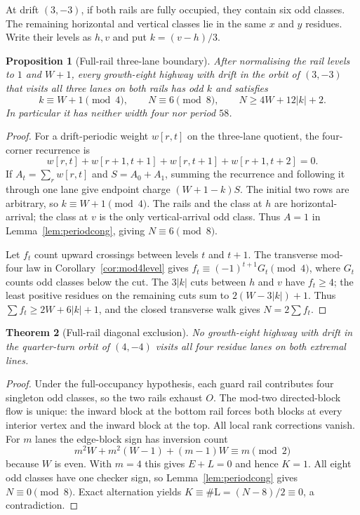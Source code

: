 \documentclass[11pt,letterpaper]{article}
\theoremstyle{plain}
\newtheorem{theorem}{Theorem}[section]
\newtheorem{proposition}[theorem]{Proposition}
\theoremstyle{definition}
\newcommand{\turnL}{\mathrm{L}}
\begin{document}
\begin{NoHyper}
At drift $(3,-3)$, if both rails are fully occupied, they contain six odd classes. The remaining
horizontal and vertical classes lie in the same $x$ and $y$ residues.  Write
their levels as $h,v$ and put $k=(v-h)/3$.

\begin{proposition}[Full-rail three-lane boundary]\label{prop:g8m3}
After normalising the rail levels to $1$ and $W+1$, every growth-eight highway
with drift in the orbit of $(3,-3)$ that visits all three lanes on both rails
has odd $k$ and satisfies
\[
 k\equiv W+1\pmod4,\qquad N\equiv6\pmod8,\qquad
 N\ge4W+12|k|+2.
\]
In particular it has neither width four nor period $58$.
\end{proposition}

\begin{proof}
For a drift-periodic weight $w[r,t]$ on the three-lane quotient, the four-corner
recurrence is
\[
 w[r,t]+w[r+1,t+1]+w[r,t+1]+w[r+1,t+2]=0.
\]
If $A_t=\sum_rw[r,t]$ and $S=A_0+A_1$, summing the recurrence and following it
through one lane give endpoint charge $(W+1-k)S$.  The initial two rows are
arbitrary, so $k\equiv W+1\pmod4$.  The rails and the class at $h$ are
horizontal-arrival; the class at $v$ is the only vertical-arrival odd class.
Thus $A=1$ in Lemma~\ref{lem:periodcong}, giving $N\equiv6\pmod8$.

Let $f_t$ count upward crossings between levels $t$ and $t+1$.  The transverse
mod-four law in Corollary~\ref{cor:mod4level} gives
$f_t\equiv(-1)^{t+1}G_t\pmod4$, where $G_t$ counts odd classes below the cut.
The $3|k|$ cuts between $h$ and $v$ have $f_t\ge4$; the least positive residues
on the remaining cuts sum to $2(W-3|k|)+1$.  Thus
$\sum f_t\ge2W+6|k|+1$, and the closed transverse walk gives
$N=2\sum f_t$.
\end{proof}

\begin{theorem}[Full-rail diagonal exclusion]\label{thm:g8m4}
No growth-eight highway with drift in the quarter-turn orbit of $(4,-4)$
visits all four residue lanes on both extremal lines.
\end{theorem}

\begin{proof}
Under the full-occupancy hypothesis, each guard rail contributes four singleton
odd classes, so the two rails exhaust
$O$.  The mod-two directed-block flow is unique: the inward block at the bottom
rail forces both blocks at every interior vertex and the inward block at the
top.  All local rank corrections vanish.  For $m$ lanes the edge-block sign has
inversion count
\[
 m^2W+m^2(W-1)+(m-1)W\equiv m\pmod2
\]
because $W$ is even.  With $m=4$ this gives $E+L=0$ and hence $K=1$.
All eight odd classes have one checker sign, so
Lemma~\ref{lem:periodcong} gives $N\equiv0\pmod8$.  Exact alternation yields
$K\equiv\#\turnL=(N-8)/2\equiv0$, a contradiction.
\end{proof}


\end{NoHyper}
\end{document}
